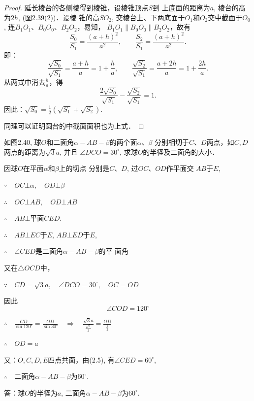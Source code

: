 \begin{proof}
    延长棱台的各侧棱得到棱锥，设棱锥顶点$S$到
    上底面的距离为$a$, 棱台的高为$2h$, (图2.39(2))．设棱
    锥的高$SO_2$, 交棱台上、下两底面于$O_1$和$O_2$交中截面于$O_0$,
    连$B_1O_1$、$B_0O_0$、$B_2O_2$，易知，
$B_1O_1\parallel B_0O_0\parallel B_2O_2$，故有
\[\frac{S_0}{S_1}=\frac{(a+h)^2}{a^2},\qquad \frac{S_2}{S_1}=\frac{(a+h)^2}{a^2}.\]
即：
\[\frac{\sqrt{S_0}}{\sqrt{S_1}}=\frac{a+h}{a}=1 + \frac{h}{a},\qquad \frac{\sqrt{S_2}}{\sqrt{S_1}}=\frac{a+2h}{a}=1+\frac{2h}{a}.\]
从两式中消去$\frac{h}{a}$，得
\[\frac{2\sqrt{S_0}}{\sqrt{S_1}}-\frac{\sqrt{S_2}}{\sqrt{S_1}}=1.\]
因此：$\sqrt{S_0}=\frac{1}{2}\left(\sqrt{S_1}+\sqrt{S_2}\right)$.

同理可以证明圆台的中截面面积也为上式．
\end{proof}


\begin{example}
    如图2.40, 球$O$和二面角$\alpha-AB-\beta$的两个面$\alpha$、$\beta$
分别相切于$C$、$D$两点，如$C,D$两点的距离为$\sqrt{3}a$, 并且
$\angle DCO=30^{\circ}$, 求球$O$的半径及二面角的大小．
\end{example}

\begin{solution}
    因球$O$在平面$\alpha$和$\beta$上的切点
分别是$C$、$D$, 过$OC$、$OD$作平面交
$AB$于$E$,

$\because\quad OC\bot\alpha,\quad OD\bot\beta$

$\therefore\quad OC\bot AB,\quad OD\bot AB$

$\therefore\quad AB\bot$平面$CED$.

$\therefore\quad AB\bot EC$于$E$, $AB\bot ED$于$E$,

$\therefore\quad \angle CED$是二面角$\alpha-AB-\beta$的平
面角

又在$\triangle OCD$中，

$\because\quad CD=\sqrt{3}a,\quad \angle DCO=30^{\circ},\quad 
OC=OD$

因此
\begin{equation}
    \angle COD=120^{\circ}
\end{equation}

$\therefore\quad \frac{CD}{\sin120^{\circ}}=\frac{OD}{\sin30^{\circ}}\quad \Rightarrow\quad \frac{\sqrt{3}a}{\frac{\sqrt{3}}{2}}=\frac{OD}{\frac{1}{2}}$

$\therefore\quad OD=a$

又：$O,C,D,E$四点共面，由(2.5), 有$\angle CED=60^{\circ}$,

$\therefore\quad $二面角$\alpha-AB-\beta$为$60^{\circ}$.

答：球$O$的半径为$a$, 二面角$\alpha-AB-\beta$为$60^{\circ}$.
\end{solution}


